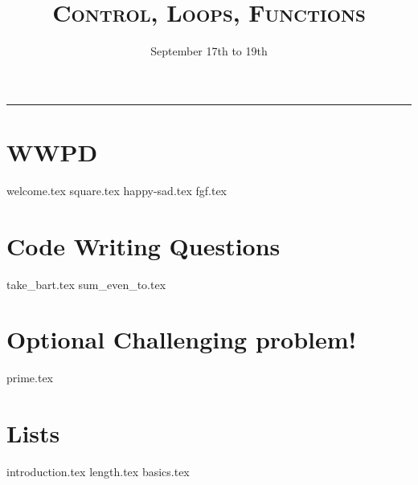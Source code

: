 \documentclass{exam}
\title{\textsc{Control, Loops, Functions}}
\date{September 17th to 19th}
\begin{document}
\maketitle
\rule{\textwidth}{0.15em}
\fontsize{12}{15}\selectfont


\section{WWPD}
\begin{questions}
{welcome.tex}
\vspace{5em}
{square.tex}
\newpage
{happy-sad.tex}
\vspace{5em}
{fgf.tex}
\end{questions}

\newpage
\section{Code Writing Questions}
\begin{questions}
{take_bart.tex}
{sum_even_to.tex}
\newpage
\section{Optional Challenging problem!}
{prime.tex}
\newpage
\section{Lists}
{introduction.tex}
{length.tex}
\newpage
{basics.tex}

\end{questions}
\end{document}
